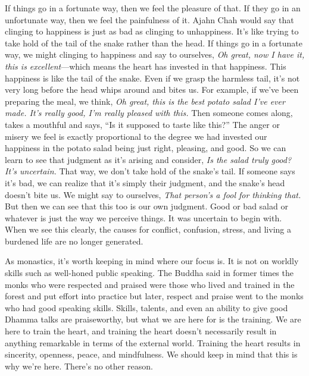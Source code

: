 If things go in a fortunate way, then we feel the pleasure of that. If 
they go in an unfortunate way, then we feel the painfulness of it. 
Ajahn Chah would say that clinging to happiness is just as bad as 
clinging to unhappiness. It's like trying to take hold of the tail of 
the snake rather than the head. If things go in a fortunate way, we 
might clinging to happiness and say to ourselves, \emph{Oh great, now I 
have it, this is excellent}---which means the heart has invested in 
that happiness. This happiness is like the tail of the snake. Even if 
we grasp the harmless tail, it's not very long before the head whips 
around and bites us. For example, if we've been preparing the meal, we 
think, \emph{Oh great, this is the best potato salad I've ever made. 
It's really good, I'm really pleased with this.} Then someone comes 
along, takes a mouthful and says, ``Is it supposed to taste like 
this?'' The anger or misery we feel is exactly proportional to the 
degree we had invested our happiness in the potato salad being just 
right, pleasing, and good. So we can learn to see that judgment as it's 
arising and consider, \emph{Is the salad truly good? It's uncertain.} 
That way, we don't take hold of the snake's tail. If someone says it's 
bad, we can realize that it's simply their judgment, and the snake's 
head doesn't bite us. We might say to ourselves, \emph{That person's a 
fool for thinking that.} But then we can see that this too is our own 
judgment. Good or bad salad or whatever is just the way we perceive 
things. It was uncertain to begin with. When we see this clearly, the 
causes for conflict, confusion, stress, and living a burdened life are 
no longer generated.


As monastics, it's worth keeping in mind where our focus is. It is not 
on worldly skills such as well-honed public speaking. The Buddha said 
in former times the monks who were respected and praised were those who 
lived and trained in the forest and put effort into practice but later, 
respect and praise went to the monks who had good speaking skills. 
Skills, talents, and even an ability to give good Dhamma talks are 
praiseworthy, but what we are here for is the training. We are here to 
train the heart, and training the heart doesn't necessarily result in 
anything remarkable in terms of the external world. Training the heart 
results in sincerity, openness, peace, and mindfulness. We should keep 
in mind that this is why we're here. There's no other reason.

